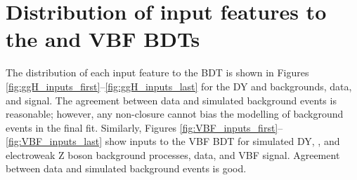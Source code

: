 \chapter{Distribution of input features to the \ggH and VBF BDTs}
\label{app:all_input_features}


The distribution of each input feature to the \ggH BDT is shown in Figures \ref{fig:ggH_inputs_first}--\ref{fig:ggH_inputs_last} for the DY and \ttbar backgrounds, data, 
and \ggH signal. The agreement between data and simulated background events is reasonable; however, any non-closure cannot bias the modelling of background events in the final fit. Similarly, Figures \ref{fig:VBF_inputs_first}--\ref{fig:VBF_inputs_last} show inputs to the VBF BDT for simulated DY, \ttbar, and electroweak Z boson background processes, data, and VBF signal. Agreement between data and simulated background events is good.

